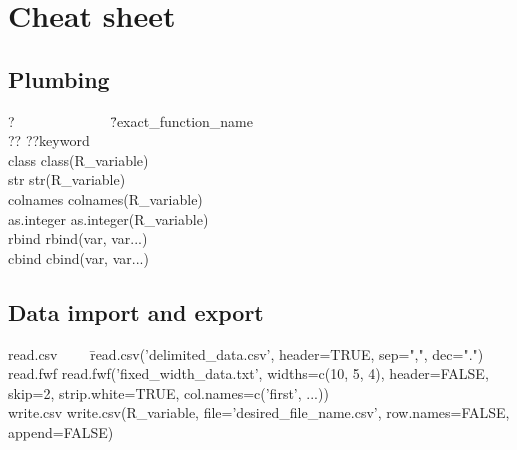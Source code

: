 \documentclass{report}
\begin{document}
\chapter{Cheat sheet}

	\section{Plumbing}
\begin{tabbing}
?~~~~~~~~~~~~~ \= ?exact\_function\_name \\
?? \> ??keyword \\
class \> class(R\_variable) \\
str \> str(R\_variable) \\
colnames \> colnames(R\_variable) \\
as.integer \> as.integer(R\_variable) \\
rbind \> rbind(var, var...) \\
cbind \> cbind(var, var...)
\end{tabbing}

	\section{Data import and export}
\begin{tabbing}
read.csv~~~~ \= read.csv('delimited\_data.csv', header=TRUE, sep=",", dec=".") \\
read.fwf \> read.fwf('fixed\_width\_data.txt', widths=c(10, 5, 4), header=FALSE, skip=2, strip.white=TRUE, col.names=c('first', ...)) \\
write.csv \> write.csv(R\_variable, file='desired\_file\_name.csv', row.names=FALSE, append=FALSE)
\end{tabbing}

\printbibliography

\printnoidxglossaries
\end{document}
